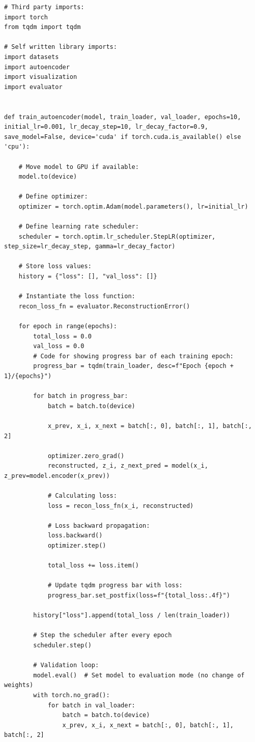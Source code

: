 \documentclass[12pt,letterpaper]{article}
\begin{document}
\begin{lstlisting}
# Third party imports:
import torch
from tqdm import tqdm

# Self written library imports:
import datasets
import autoencoder
import visualization
import evaluator


def train_autoencoder(model, train_loader, val_loader, epochs=10, initial_lr=0.001, lr_decay_step=10, lr_decay_factor=0.9, save_model=False, device='cuda' if torch.cuda.is_available() else 'cpu'):

    # Move model to GPU if available:
    model.to(device)
    
    # Define optimizer:
    optimizer = torch.optim.Adam(model.parameters(), lr=initial_lr)

    # Define learning rate scheduler:
    scheduler = torch.optim.lr_scheduler.StepLR(optimizer, step_size=lr_decay_step, gamma=lr_decay_factor)

    # Store loss values:
    history = {"loss": [], "val_loss": []}

    # Instantiate the loss function:
    recon_loss_fn = evaluator.ReconstructionError()

    for epoch in range(epochs):
        total_loss = 0.0
        val_loss = 0.0
        # Code for showing progress bar of each training epoch:
        progress_bar = tqdm(train_loader, desc=f"Epoch {epoch + 1}/{epochs}")

        for batch in progress_bar:
            batch = batch.to(device)

            x_prev, x_i, x_next = batch[:, 0], batch[:, 1], batch[:, 2]

            optimizer.zero_grad()
            reconstructed, z_i, z_next_pred = model(x_i, z_prev=model.encoder(x_prev))

            # Calculating loss:
            loss = recon_loss_fn(x_i, reconstructed)

            # Loss backward propagation:
            loss.backward()
            optimizer.step()

            total_loss += loss.item()

            # Update tqdm progress bar with loss:
            progress_bar.set_postfix(loss=f"{total_loss:.4f}")

        history["loss"].append(total_loss / len(train_loader))

        # Step the scheduler after every epoch
        scheduler.step()

        # Validation loop:
        model.eval()  # Set model to evaluation mode (no change of weights)
        with torch.no_grad():
            for batch in val_loader:
                batch = batch.to(device)
                x_prev, x_i, x_next = batch[:, 0], batch[:, 1], batch[:, 2]


\end{lstlisting}
\end{document}

